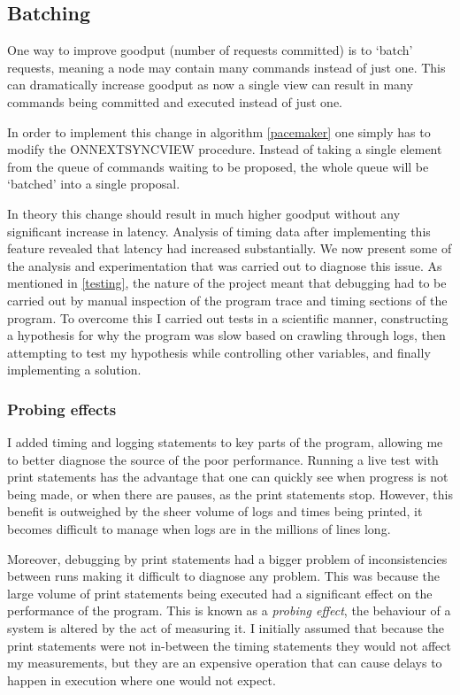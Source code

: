 \subsection{Batching}
One way to improve goodput (number of requests committed) is to `batch' requests, meaning a node may contain many commands instead of just one. This can dramatically increase goodput as now a single view can result in many commands being committed and executed instead of just one.

In order to implement this change in algorithm \ref{pacemaker} one simply has to modify the ON{\large N}EXT{\large S}YNC{\large V}IEW procedure. Instead of taking a single element from the queue of commands waiting to be proposed, the whole queue will be `batched' into a single proposal.

In theory this change should result in much higher goodput without any significant increase in latency. Analysis of timing data after implementing this feature revealed that latency had increased substantially. We now present some of the analysis and experimentation that was carried out to diagnose this issue. As mentioned in \ref{testing}, the nature of the project meant that debugging had to be carried out by manual inspection of the program trace and timing sections of the program. To overcome this I carried out tests in a scientific manner, constructing a hypothesis for why the program was slow based on crawling through logs, then attempting to test my hypothesis while controlling other variables, and finally implementing a solution.

\subsubsection{Probing effects}
I added timing and logging statements to key parts of the program, allowing me to better diagnose the source of the poor performance. Running a live test with print statements has the advantage that one can quickly see when progress is not being made, or when there are pauses, as the print statements stop. However, this benefit is outweighed by the sheer volume of logs and times being printed, it becomes difficult to manage when logs are in the millions of lines long.

Moreover, debugging by print statements had a bigger problem of inconsistencies between runs making it difficult to diagnose any problem. This was because the large volume of print statements being executed had a significant effect on the performance of the program. This is known as a \textit{probing effect}, the behaviour of a system is altered by the act of measuring it. I initially assumed that because the print statements were not in-between the timing statements they would not affect my measurements, but they are an expensive operation that can cause delays to happen in execution where one would not expect.

